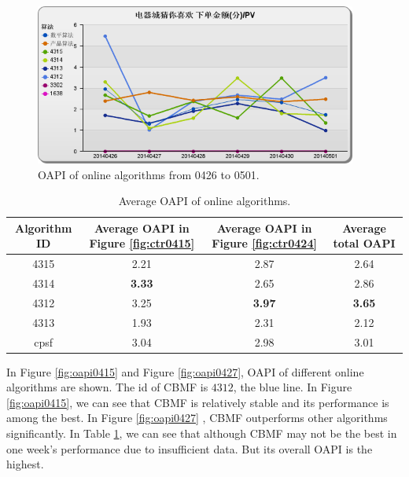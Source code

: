 \begin{figure}
\begin{center}



\includegraphics[width=400px]{fig/yixunexp/cvr0502.png}
\caption{\label{fig:oapi0426} OAPI of online algorithms  from 0426 to 0501.}
\end{center}
\end{figure}

\begin{table}[h]


\begin{center}
\begin{tabular}{| c | c | c | c |}
\hline
Algorithm ID & Average OAPI in Figure \ref{fig:ctr0415} & Average OAPI in Figure \ref{fig:ctr0424} & Average total OAPI \\
\hline
4315 &2.21 & 2.87 & 2.64\\
\hline
4314 &\textbf{3.33} & 2.65& 2.86\\
\hline
4312 &3.25& \textbf{3.97}& \textbf{3.65}\\
\hline
4313 & 1.93 & 2.31& 2.12\\
\hline
cpsf & 3.04& 2.98 & 3.01\\
\hline
\end{tabular}
\caption{\label{tbl:cvravg} Average OAPI of online algorithms.}
\end{center}
\end{table}

In Figure \ref{fig:oapi0415} and Figure \ref{fig:oapi0427}, OAPI of different online algorithms are shown. The id of CBMF is $4312$, the blue line. In Figure \ref{fig:oapi0415}, we can see that CBMF is relatively stable and its performance is among the best. In Figure \ref{fig:oapi0427} , CBMF outperforms other algorithms significantly. In Table \ref{tbl:cvravg}, we can see that although CBMF may not be the best in one week's performance due to insufficient data. But its overall OAPI is the highest.

